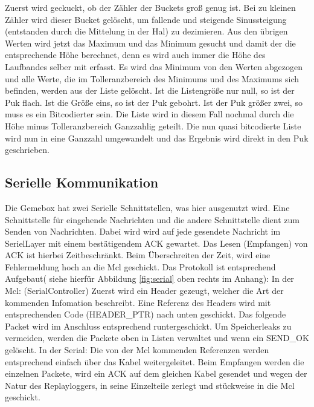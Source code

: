 \documentclass[
   draft=false
  ,paper=a4
  ,twoside=true
  ,fontsize=11pt
  ,headsepline
  ,DIV11
  ,parskip=full+
]{scrartcl} %
\begin{document}
Zuerst wird geckuckt, ob der Zähler der Buckets groß genug ist. Bei zu kleinen Zähler wird dieser Bucket gelöscht, um fallende und steigende Sinussteigung (entstanden durch die Mittelung in der Hal) zu dezimieren. 
Aus den übrigen Werten wird jetzt das Maximum und das Minimum gesucht und damit der die entsprechende Höhe berechnet, denn es wird auch immer die Höhe des Laufbandes selber mit erfasst.
Es wird das Minimum von den Werten abgezogen und alle Werte, die im Tolleranzbereich des Minimums und des Maximums sich befinden, werden aus der Liste gelöscht. Ist die Listengröße 
nur null, so ist der Puk flach. Ist die Größe eins, so ist der Puk gebohrt.
Ist der Puk größer zwei, so muss es ein Bitcodierter sein. 
Die Liste wird in diesem Fall nochmal durch die Höhe minus Tolleranzbereich Ganzzahlig geteilt. Die nun quasi bitcodierte Liste wird nun in eine Ganzzahl umgewandelt und das Ergebnis wird direkt in den Puk geschrieben.
\subsection{Serielle Kommunikation}
Die Gemebox hat zwei Serielle Schnittstellen, was hier ausgenutzt wird. Eine Schnittstelle für eingehende Nachrichten und die andere Schnittstelle dient zum Senden von Nachrichten.
Dabei wird wird auf jede gesendete Nachricht im SerielLayer mit einem bestätigendem ACK gewartet. Das Lesen (Empfangen) von ACK ist hierbei Zeitbeschränkt. Beim Überschreiten der Zeit, wird eine Fehlermeldung hoch an die Mcl geschickt.
Das Protokoll ist entsprechend Aufgebaut( siehe hierfür Abbildung \ref{fig:serial} oben rechts im Anhang):
\newline
In der Mcl: (SerialController)
Zuerst wird ein Header gezeugt, welcher die Art der kommenden Infomation 
beschreibt. Eine Referenz des Headers wird mit entsprechenden Code 
(HEADER\_PTR) nach unten geschickt. Das folgende Packet wird im Anschluss entsprechend runtergeschickt. Um Speicherleaks zu vermeiden, werden die Packete oben in Listen verwaltet und wenn ein SEND\_OK gelöscht.
\newline
In der Serial:
Die von der Mcl kommenden Referenzen werden entsprechend einfach über das  Kabel weitergeleitet.
\newline
Beim Empfangen werden die einzelnen Packete, wird ein ACK auf dem gleichen Kabel gesendet und wegen der Natur des Replayloggers, in seine Einzelteile zerlegt und stückweise in die Mcl geschickt.
\end{document}
